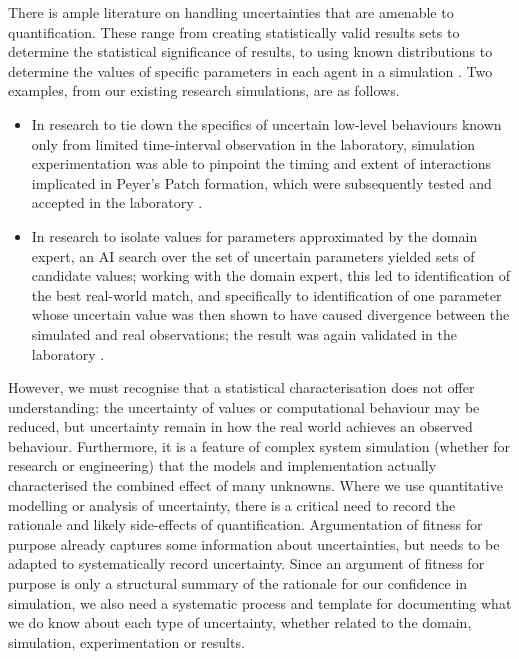 \documentclass[sigconf,authordraft]{acmart}
\begin{document}
There is ample literature on handling uncertainties that are amenable to quantification.  These range from creating statistically valid results sets to determine the statistical significance of results, to using known distributions to determine the values of specific parameters in each agent in a simulation \cite{read-stats,spartan-sim,spartan}. 
Two examples, from our existing research simulations, are as follows.
\begin{itemize}
    \item In research to tie down the specifics of uncertain low-level behaviours known only from limited time-interval observation in the laboratory, simulation experimentation was able to pinpoint the timing and extent of interactions implicated in Peyer's Patch formation, which were subsequently tested and accepted in the laboratory \cite{aldenPhD,sim-pp}.
    \item In research to isolate values for  parameters approximated by  the domain expert, an AI search over the set of uncertain parameters yielded sets of candidate values; working with the domain expert, this led to identification of the best real-world match, and specifically to identification of one parameter whose uncertain value was then shown to have caused divergence between the simulated and real observations; the result was again validated in the laboratory \cite{garnett2010computer}.
\end{itemize}

However, we must recognise that a statistical characterisation does not offer understanding: the uncertainty of values or computational behaviour may be reduced, but uncertainty remain in how the real world achieves an observed behaviour. 
Furthermore, it is a feature of complex system simulation (whether for research or engineering) that the models and implementation actually characterised the combined effect of many unknowns. Where we use quantitative modelling or analysis of uncertainty, there is a critical need to record the rationale and likely side-effects of quantification.  Argumentation of fitness for purpose already captures some information about uncertainties, but needs to be adapted to systematically record uncertainty.  Since an argument of fitness for purpose is only a structural summary of the rationale for our confidence in simulation, we also need a systematic process and template for  documenting what we do know about each type of uncertainty, whether related to the domain, simulation, experimentation or results.
\end{document}
